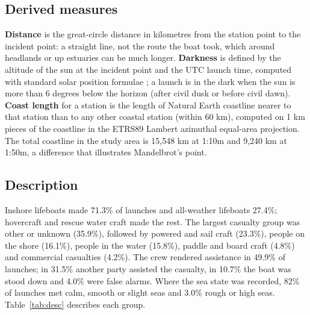 \documentclass[11pt,a4paper]{article}
\begin{document}
\subsection{Derived measures}
\textbf{Distance} is the great-circle distance in kilometres from the station point to the incident point: a straight line, not the route the boat took, which around headlands or up estuaries can be much longer. \textbf{Darkness} is defined by the altitude of the sun at the incident point and the UTC launch time, computed with standard solar position formulae \citep{meeus1998}; a launch is in the dark when the sun is more than 6 degrees below the horizon (after civil dusk or before civil dawn). \textbf{Coast length} for a station is the length of Natural Earth coastline nearer to that station than to any other coastal station (within 60 km), computed on 1 km pieces of the coastline in the ETRS89 Lambert azimuthal equal-area projection. The total coastline in the study area is 15,548 km at 1:10m and 9,240 km at 1:50m, a difference that illustrates Mandelbrot's point.

\subsection{Description}
Inshore lifeboats made 71.3\% of launches and all-weather lifeboats 27.4\%; hovercraft and rescue water craft made the rest. The largest casualty group was other or unknown (35.9\%), followed by powered and sail craft (23.3\%), people on the shore (16.1\%), people in the water (15.8\%), paddle and board craft (4.8\%) and commercial casualties (4.2\%). The crew rendered assistance in 49.9\% of launches; in 31.5\% another party assisted the casualty, in 10.7\% the boat was stood down and 4.0\% were false alarms. Where the sea state was recorded, 82\% of launches met calm, smooth or slight seas and 3.0\% rough or high seas. Table~\ref{tab:desc} describes each group.
\end{document}
